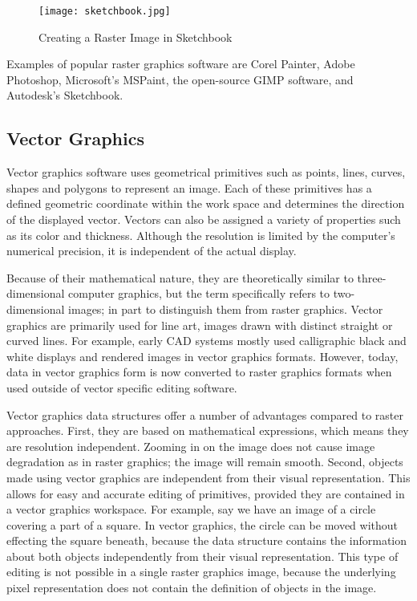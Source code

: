 \begin{figure}
\texttt{[image: sketchbook.jpg]}
\caption{Creating a Raster Image in Sketchbook}
\end{figure}



Examples of popular raster graphics software are Corel Painter\autocite{coreal}, Adobe Photoshop\autocite{photoshop}, Microsoft's MSPaint\autocite{mspaint}, the open-source GIMP software\autocite{gimp}, and Autodesk's Sketchbook\autocite{sketchbook}.

\subsection{Vector Graphics}

Vector graphics software uses geometrical primitives such as points, lines, curves, shapes and polygons to represent an image.
Each of these primitives has a defined geometric coordinate within the work space and determines the direction of the displayed vector. 
Vectors can also be assigned a variety of properties such as its color and thickness.
Although the resolution is limited by the computer's numerical precision, it is independent of the actual display. 

Because of their mathematical nature, they are theoretically similar to three-dimensional computer graphics, but the term specifically refers to two-dimensional images; in part to distinguish them from raster graphics.
Vector graphics are primarily used for line art, images drawn with distinct straight or curved lines.
For example, early CAD systems mostly used calligraphic black and white displays and rendered images in vector graphics formats. 
However, today, data in vector graphics form is now converted to raster graphics formats when used outside of vector specific editing software.  

Vector graphics data structures offer a number of advantages compared to raster approaches. 
First, they are based on mathematical expressions, which means they are resolution independent.
Zooming in on the image does not cause image degradation as in raster graphics; the image will remain smooth. 
Second, objects made using vector graphics are independent from their visual representation.
This allows for easy and accurate editing of primitives, provided they are contained in a vector graphics workspace.
For example, say we have an image of a circle covering a part of a square. In vector graphics, the circle can be moved without effecting the square beneath, because the data structure contains the information about both objects independently from their visual representation.
This type of editing is not possible in a single raster graphics image, because the underlying pixel representation does not contain the definition of objects in the image.
 

